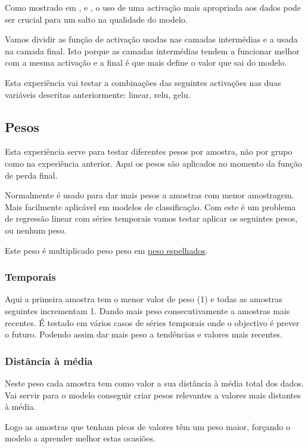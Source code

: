 Como mostrado em \cite{Vaswani2017}, e \cite{Liu2022}, o uso de uma activação mais apropriada aos dados pode ser crucial para um salto na qualidade do modelo.\par
Vamos dividir as função de activação usadas nas camadas intermédias e a usada na camada final. Isto porque as camadas intermédias tendem a funcionar melhor com a mesma activação e a final é que mais define o valor que sai do modelo.\par
Esta experiência vai testar a combinações das seguintes activações nas duas variáveis descritas anteriormente: linear, relu, gelu.\par


\subsection{Pesos}
Esta experiência serve para testar diferentes pesos por amostra, não por grupo como na experiência anterior. Aqui os pesos são aplicados no momento da função de perda final.\par
Normalmente é usado para dar mais pesos a amostras com menor amostragem. Mais facilmente aplicável em modelos de classificação. Com este é um problema de regressão linear com séries temporais vamos testar aplicar os seguintes pesos, ou nenhum peso.\par
Este peso é multiplicado peso peso em \hyperref[se:advancedloss]{peso espelhados}.


\subsubsection{Temporais}
Aqui a primeira amostra tem o menor valor de peso (1) e todas as amostras seguintes incrementam 1. Dando mais peso consecutivamente a amostras mais recentes. É testado em vários casos de séries temporais onde o objectivo é prever o futuro. Podendo assim dar mais peso a tendências e valores mais recentes.\par

\subsubsection{Distância à média}
Neste peso cada amostra tem como valor a sua distância à média total dos dados. Vai servir para o modelo conseguir criar pesos relevantes a valores mais distantes à média.\par
Logo as amostras que tenham picos de valores têm um peso maior, forçando o modelo a aprender melhor estas ocasiões.

